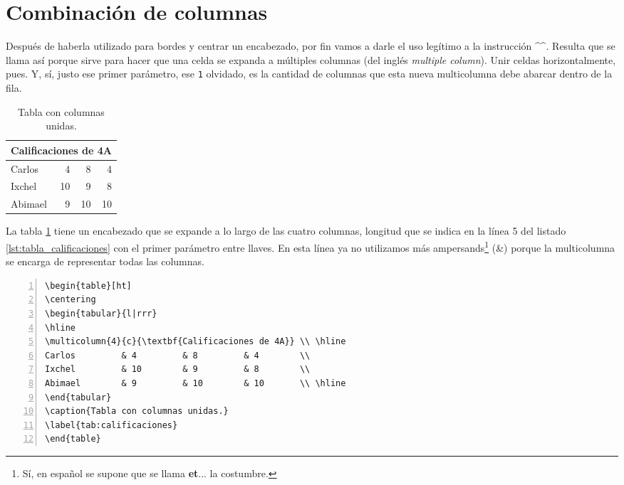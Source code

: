 \section{Combinación de columnas}
\label{sec:combinacion_de_columnas}



Después de haberla utilizado para bordes y centrar un encabezado, por fin vamos a darle el uso legítimo a la instrucción ^\multicolumn^. Resulta que se llama así porque sirve para hacer que una celda se expanda a múltiples columnas (del inglés \emph{multiple column}). Unir celdas horizontalmente, pues. Y, sí, justo ese primer parámetro, ese \texttt{1} olvidado, es la cantidad de columnas que esta nueva multicolumna debe abarcar dentro de la fila.

\begin{table}[ht]
\centering
\begin{tabular}{l|rrr}
\hline
\multicolumn{4}{c}{\textbf{Calificaciones de 4A}} \\ \hline
Carlos         & 4         & 8         & 4        \\
Ixchel         & 10        & 9         & 8        \\
Abimael        & 9         & 10        & 10       \\ \hline
\end{tabular}
\caption{Tabla con columnas unidas.}
\label{tab:calificaciones}
\end{table}

La tabla \ref{tab:calificaciones} tiene un encabezado que se expande a lo largo de las cuatro columnas, longitud que se indica en la línea 5 del listado \ref{lst:tabla_calificaciones} con el primer parámetro entre llaves. En esta línea ya no utilizamos más ampersands\footnote{Sí, en español se supone que se llama \textbf{et}... la costumbre.} (\&) porque la multicolumna se encarga de representar todas las columnas.

\begin{lstlisting}[style=latex,numbers=left,caption={Tabla con encabezado de cuatro columnas de ancho.},label={lst:tabla_calificaciones},
linebackgroundcolor={%
	\ifnum \value{lstnumber} =  5 \color{codigo_linea_resaltada}
	\else \color{codigo_fondo}
	\fi % Tantos \fi como líneas subrayadas.
}]
\begin{table}[ht]
\centering
\begin{tabular}{l|rrr}
\hline
\multicolumn{4}{c}{\textbf{Calificaciones de 4A}} \\ \hline
Carlos         & 4         & 8         & 4        \\
Ixchel         & 10        & 9         & 8        \\
Abimael        & 9         & 10        & 10       \\ \hline
\end{tabular}
\caption{Tabla con columnas unidas.}
\label{tab:calificaciones}
\end{table}
\end{lstlisting}



